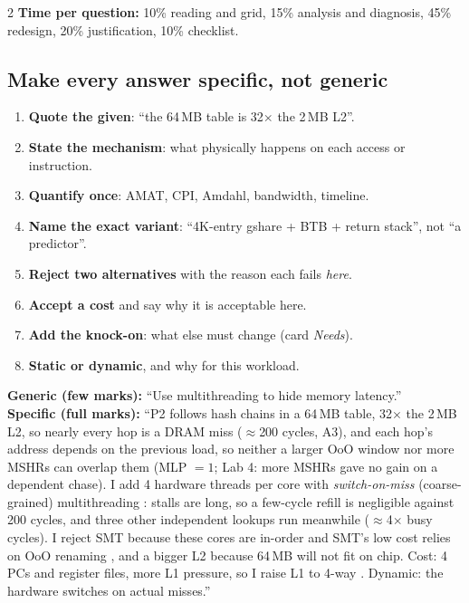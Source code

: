 \begin{multicols}{2}
\textbf{Time per question:} 10\% reading and grid, 15\% analysis and diagnosis, 45\% redesign, 20\% justification, 10\% checklist.

\subsection{Make every answer specific, not generic}\label{sec:specific}
\begin{enumerate}[label=\textbf{R\arabic*}]
\item \textbf{Quote the given}: ``the 64\,MB table is 32$\times$ the 2\,MB L2''.
\item \textbf{State the mechanism}: what physically happens on each access or instruction.
\item \textbf{Quantify once}: AMAT, CPI, Amdahl, bandwidth, timeline.
\item \textbf{Name the exact variant}: ``4K-entry gshare + BTB + return stack'', not ``a predictor''.
\item \textbf{Reject two alternatives} with the reason each fails \emph{here}.
\item \textbf{Accept a cost} and say why it is acceptable here.
\item \textbf{Add the knock-on}: what else must change (card \emph{Needs}).
\item \textbf{Static or dynamic}, and why for this workload.
\end{enumerate}

\begin{ex}
\textbf{Generic (few marks):} ``Use multithreading to hide memory latency.''\\
\textbf{Specific (full marks):} ``P2 follows hash chains in a 64\,MB table, 32$\times$ the 2\,MB L2, so nearly every hop is a DRAM miss ($\approx$200 cycles, A3), and each hop's address depends on the previous load, so neither a larger OoO window nor more MSHRs can overlap them (MLP $=1$; Lab 4: more MSHRs gave no gain on a dependent chase). I add 4 hardware threads per core with \emph{switch-on-miss} (coarse-grained) multithreading : stalls are long, so a few-cycle refill is negligible against 200 cycles, and three other independent lookups run meanwhile ($\approx$4$\times$ busy cycles). I reject SMT because these cores are in-order and SMT's low cost relies on OoO renaming , and a bigger L2 because 64\,MB will not fit on chip. Cost: 4 PCs and register files, more L1 pressure, so I raise L1 to 4-way . Dynamic: the hardware switches on actual misses.''
\end{ex}


\end{multicols}
